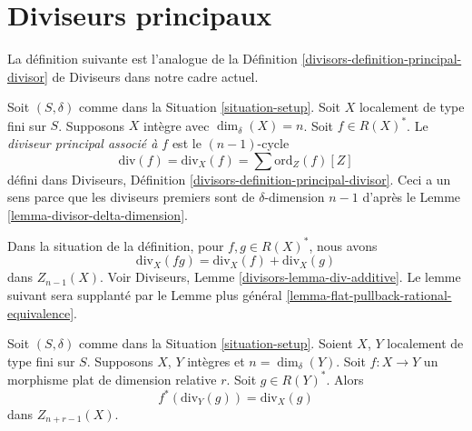 \section{Diviseurs principaux}
\label{section-principal-divisors}

\noindent
La définition suivante est l'analogue de la
Définition \ref{divisors-definition-principal-divisor} de Diviseurs
dans notre cadre actuel.

\begin{definition}
\label{definition-principal-divisor}
Soit $(S, \delta)$ comme dans la Situation \ref{situation-setup}.
Soit $X$ localement de type fini sur $S$. Supposons $X$
intègre avec $\dim_\delta(X) = n$.
Soit $f \in R(X)^*$. Le {\it diviseur principal
associé à $f$} est le $(n - 1)$-cycle
$$
\text{div}(f) = \text{div}_X(f) = \sum \text{ord}_Z(f) [Z]
$$
défini dans Diviseurs, Définition \ref{divisors-definition-principal-divisor}.
Ceci a un sens parce que les diviseurs premiers sont de $\delta$-dimension $n - 1$ d'après le
Lemme \ref{lemma-divisor-delta-dimension}.
\end{definition}

\noindent
Dans la situation de la définition, pour $f, g \in R(X)^*$, nous avons
$$
\text{div}_X(fg) = \text{div}_X(f) + \text{div}_X(g)
$$
dans $Z_{n - 1}(X)$. Voir Diviseurs, Lemme \ref{divisors-lemma-div-additive}.
Le lemme suivant sera supplanté par le Lemme plus général
\ref{lemma-flat-pullback-rational-equivalence}.

\begin{lemma}
\label{lemma-flat-pullback-principal-divisor}
Soit $(S, \delta)$ comme dans la Situation \ref{situation-setup}.
Soient $X$, $Y$ localement de type fini sur $S$. Supposons $X$, $Y$
intègres et $n = \dim_\delta(Y)$.
Soit $f : X \to Y$ un morphisme plat de dimension relative $r$.
Soit $g \in R(Y)^*$. Alors
$$
f^*(\text{div}_Y(g)) = \text{div}_X(g)
$$
dans $Z_{n + r - 1}(X)$.
\end{lemma}

